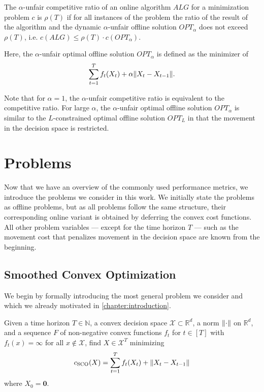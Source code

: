 \begin{definition}
\cite{Andrew2015} The $\alpha$-unfair competitive ratio of an online algorithm $ALG$ for a minimization problem $c$ is $\rho(T)$ if for all instances of the problem the ratio of the result of the algorithm and the dynamic $\alpha$-unfair offline solution $OPT_{\alpha}$ does not exceed $\rho(T)$, i.e. $c(ALG) \leq \rho(T) \cdot c(OPT_{\alpha})$.

Here, the $\alpha$-unfair optimal offline solution $OPT_{\alpha}$ is defined as the minimizer of \begin{align*}
    \sum_{t=1}^T f_t(X_t) + \alpha \lVert X_t - X_{t-1}\rVert.
\end{align*}
\end{definition}

Note that for $\alpha = 1$, the $\alpha$-unfair competitive ratio is equivalent to the competitive ratio. For large $\alpha$, the $\alpha$-unfair optimal offline solution $OPT_{\alpha}$ is similar to the $L$-constrained optimal offline solution $OPT_L$ in that the movement in the decision space is restricted.

\section{Problems}

Now that we have an overview of the commonly used performance metrics, we introduce the problems we consider in this work. We initially state the problems as offline problems, but as all problems follow the same structure, their corresponding online variant is obtained by deferring the convex cost functions. All other problem variables --- except for the time horizon $T$ --- such as the movement cost that penalizes movement in the decision space are known from the beginning.

\subsection{Smoothed Convex Optimization}

We begin by formally introducing the most general problem we consider and which we already motivated in \cref{chapter:introduction}.

\begin{problem}\label{problem:smoothed_convex_optimization}
Given a time horizon $T \in \mathbb{N}$, a convex decision space $\mathcal{X} \subset \mathbb{R}^d$, a norm $\lVert\cdot\rVert$ on $\mathbb{R}^d$, and a sequence $F$ of non-negative convex functions $f_t$ for $t \in [T]$ with $f_t(x) = \infty$ for all $x \not\in \mathcal{X}$, find $X \in \mathcal{X}^T$ minimizing \begin{align*}
    c_{\text{SCO}}(X) = \sum_{t=1}^T f_t(X_t) + \lVert X_t - X_{t-1}\rVert
\end{align*}
where $X_0 = \mathbf{0}$.
\end{problem}

